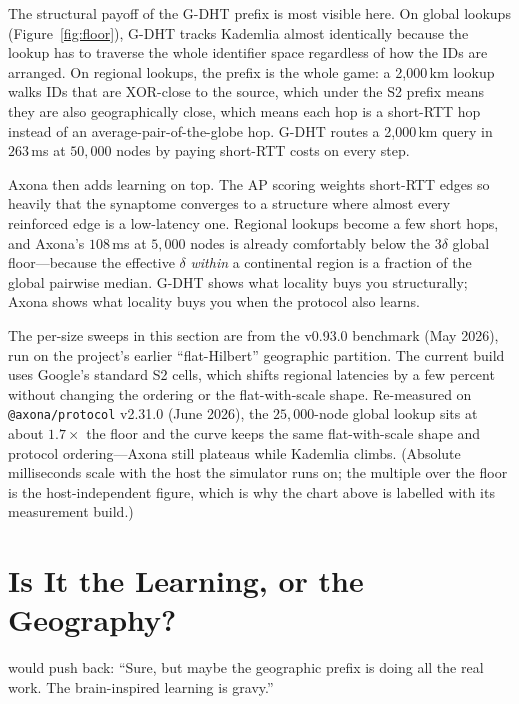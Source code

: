\documentclass[nobib]{tufte-handout}
\begin{document}
The structural payoff of the G-DHT prefix is most visible here.  On global lookups (Figure~\ref{fig:floor}), G-DHT tracks Kademlia almost identically because the lookup has to traverse the whole identifier space regardless of how the IDs are arranged.  On regional lookups, the prefix is the whole game: a 2{,}000\,km lookup walks IDs that are XOR-close to the source, which under the S2 prefix means they are also geographically close, which means each hop is a short-RTT hop instead of an average-pair-of-the-globe hop.  G-DHT routes a 2{,}000\,km query in $263$\,ms at $50{,}000$ nodes by paying short-RTT costs on every step.

Axona then adds learning on top.  The AP scoring weights short-RTT edges so heavily that the synaptome converges to a structure where almost every reinforced edge is a low-latency one.  Regional lookups become a few short hops, and Axona's $108$\,ms at $5{,}000$ nodes is already comfortably below the $3\delta$ global floor---because the effective $\delta$ \emph{within} a continental region is a fraction of the global pairwise median.  G-DHT shows what locality buys you structurally; Axona shows what locality buys you when the protocol also learns.

 The per-size sweeps in this section are from the v0.93.0 benchmark (May 2026), run on the project's earlier ``flat-Hilbert'' geographic partition. The current build uses Google's standard S2 cells, which shifts regional latencies by a few percent without changing the ordering or the flat-with-scale shape. Re-measured on \texttt{@axona/protocol} v2.31.0 (June 2026), the $25{,}000$-node global lookup sits at about $1.7\times$ the floor and the curve keeps the same flat-with-scale shape and protocol ordering---Axona still plateaus while Kademlia climbs. (Absolute milliseconds scale with the host the simulator runs on; the multiple over the floor is the host-independent figure, which is why the chart above is labelled with its measurement build.)

\section{Is It the Learning, or the Geography?}

 would push back: ``Sure, but maybe the geographic prefix is doing all the real work. The brain-inspired learning is gravy.''
\end{document}
